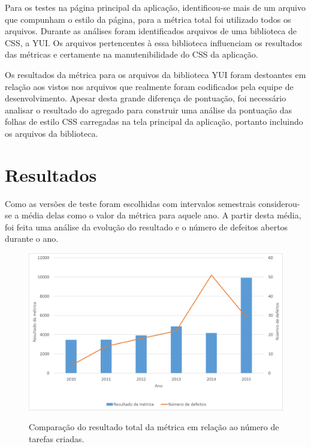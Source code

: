 Para os testes na página principal da aplicação, identificou-se mais de um arquivo que compunham o estilo da página, para a métrica total foi utilizado todos os arquivos. Durante as análises foram identificados arquivos de uma biblioteca de CSS, a YUI\footnotemark. Os arquivos pertencentes à essa biblioteca influenciam os resultados das métricas e certamente na manutenibilidade do CSS da aplicação.


Os resultados da métrica para os arquivos da biblioteca YUI foram destoantes em relação aos vistos nos arquivos que realmente foram codificados pela equipe de desenvolvimento. Apesar desta grande diferença de pontuação, foi necessário  analisar o resultado do agregado para construir uma análise da pontuação das folhas de estilo CSS carregadas na tela principal da aplicação, portanto incluindo os arquivos da biblioteca.

\section{Resultados}

Como as versões de teste foram escolhidas com intervalos semestrais considerou-se a média delas como o valor da métrica para aquele ano. A partir desta média, foi feita uma análise da evolução do resultado e o número de defeitos abertos durante o ano.

\begin{figure}[!htbp]
	\centering
	\caption{Comparação do resultado total da métrica em relação ao número de tarefas criadas.}
	\includegraphics[width=1\textwidth]{./04-figuras/total_issues}
	\label{fig:totalXIssue}
\end{figure}

